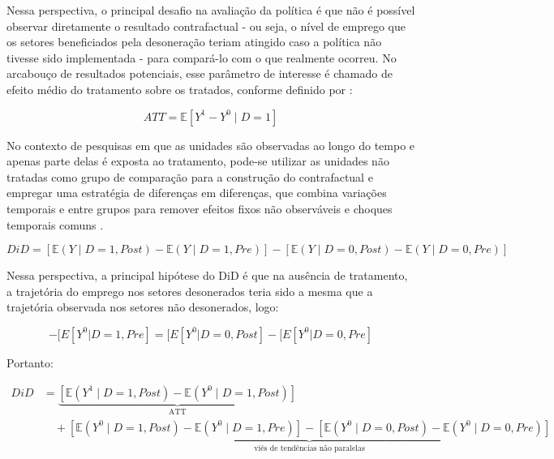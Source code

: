 \documentclass[12pt,a4paper,oneside]{article}
\begin{document}
		Nessa perspectiva, o principal desafio na avaliação da política é que não é possível observar diretamente o resultado contrafactual - ou seja, o nível de emprego que os setores beneficiados pela desoneração teriam atingido caso a política não tivesse sido implementada - para compará-lo com o que realmente ocorreu. No arcabouço de resultados potenciais, esse parâmetro de interesse é chamado de efeito médio do tratamento sobre os tratados, conforme definido por \citet{imbens2009}:

		
\begin{equation*}
	ATT = \mathbb{E}[Y^1 - Y^0 \mid D = 1]
\end{equation*}
		
No contexto de pesquisas em que as unidades são observadas ao longo do tempo e apenas parte delas é exposta ao tratamento, pode-se utilizar as unidades não tratadas como grupo de comparação para a construção do contrafactual e empregar uma estratégia de diferenças em diferenças, que combina variações temporais e entre grupos para remover efeitos fixos não observáveis e choques temporais comuns \citep{angrist2009}.

		
		
		\begin{equation}
			DiD =
			\left[
			\mathbb{E}(Y \mid D = 1, Post) -
			\mathbb{E}(Y \mid D = 1, Pre)
			\right]
			-
			\left[
			\mathbb{E}(Y \mid D = 0, Post) -
			\mathbb{E}(Y \mid D = 0, Pre)
			\right]
		\end{equation}


Nessa perspectiva, a principal hipótese do DiD é que na ausência de tratamento, a trajetória do emprego nos setores desonerados teria sido a mesma que a trajetória observada nos setores não desonerados, logo:

\begin{equation*}
	[E[Y^0|D = 1, Post] - [E[Y^0|D = 1, Pre]
	= [E[Y^0|D = 0, Post] - [E[Y^0|D = 0, Pre]
\end{equation*}

Portanto:

\begin{equation*}
	\begin{split}
		DiD
		&=
		\underbrace{
			\left[
			\mathbb{E}(Y^1 \mid D = 1, Post)
			-
			\mathbb{E}(Y^0 \mid D = 1, Post)
			\right]
		}_{\text{ATT}}
		\\[0.3cm]
		&\quad +
		\underbrace{
			\left[
			\mathbb{E}(Y^0 \mid D = 1, Post)
			-
			\mathbb{E}(Y^0 \mid D = 1, Pre)
			\right]
			-
			\left[
			\mathbb{E}(Y^0 \mid D = 0, Post)
			-
			\mathbb{E}(Y^0 \mid D = 0, Pre)
			\right]
		}_{\text{viés de tendências não paralelas}}
	\end{split}
\end{equation*}
\end{document}
